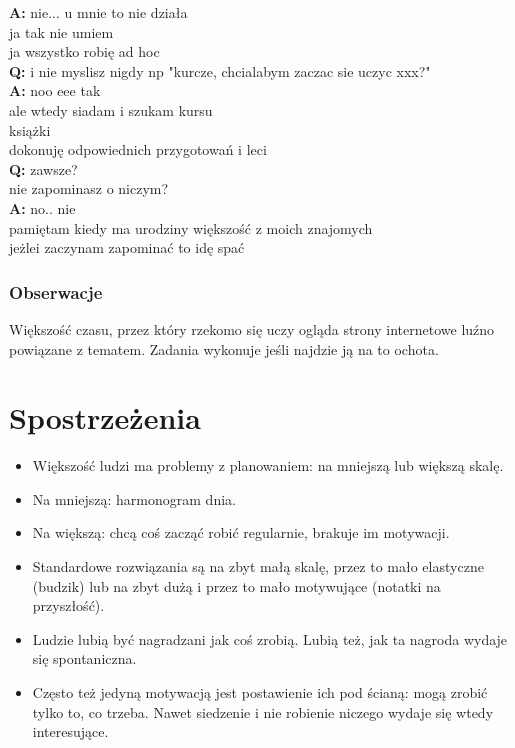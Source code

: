 \documentclass[11pt,wide]{mwart}
\newcommand{\w}[1]{
    \indent\textbf{#1}
 }
\begin{document}
\begin{multicols}{2}
\w{A:}nie... u mnie to nie działa\\
ja tak nie umiem\\
ja wszystko robię ad hoc\\
\w{Q:}i nie myslisz nigdy np "kurcze, chcialabym zaczac sie uczyc xxx?"\\
\w{A:}noo eee tak\\
ale wtedy siadam i szukam kursu \\
książki\\
dokonuję odpowiednich przygotowań i leci \\
\w{Q:}zawsze?\\
nie zapominasz o niczym?\\
\w{A:}no.. nie\\
pamiętam kiedy ma urodziny większość z moich znajomych\\
jeżlei zaczynam zapominać to idę spać \\
\end{multicols}
\subsubsection{Obserwacje}
Większość czasu, przez który rzekomo się uczy ogląda strony internetowe luźno powiązane z tematem. Zadania wykonuje jeśli najdzie ją na to ochota.
\section{Spostrzeżenia}
\begin{itemize}
  \item Większość ludzi ma problemy z planowaniem: na mniejszą lub większą skalę.
  \item Na mniejszą: harmonogram dnia.
  \item Na większą: chcą coś zacząć robić regularnie, brakuje im motywacji.
  \item Standardowe rozwiązania są na zbyt małą skalę, przez to mało elastyczne (budzik) lub na zbyt dużą i przez to mało motywujące (notatki na przyszłość).
  \item Ludzie lubią być nagradzani jak coś zrobią. Lubią też, jak ta nagroda wydaje się spontaniczna.
  \item Często też jedyną motywacją jest postawienie ich pod ścianą: mogą zrobić tylko to, co trzeba. Nawet siedzenie i nie robienie niczego wydaje się wtedy interesujące.
\end{itemize}
\end{document}
